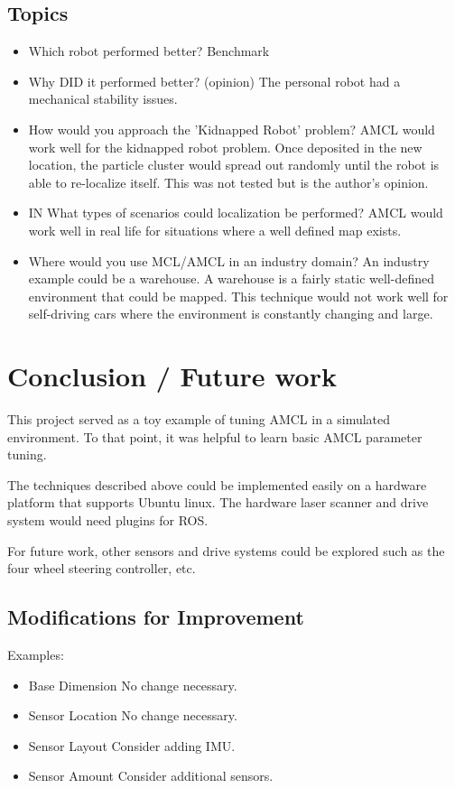 \documentclass[10pt,journal,compsoc]{IEEEtran}
\begin{document}
\subsection{Topics}
\begin{itemize}
\item Which robot performed better?
Benchmark
\item Why DID it performed better? (opinion)
The personal robot had a mechanical stability issues.
\item How would you approach the 'Kidnapped Robot' problem?
AMCL would work well for the kidnapped robot problem. Once deposited in the new location, the particle cluster would spread out randomly until the robot is able to re-localize itself. This was not tested but is the author's opinion.
\item IN What types of scenarios could localization be performed?
AMCL would work well in real life for situations where a well defined map exists.
\item Where would you use MCL/AMCL in an industry domain?
An industry example could be a warehouse. A warehouse is a fairly static well-defined environment that could be mapped. This technique would not work well for self-driving cars where the environment is constantly changing and large.

\end {itemize}

\section{Conclusion / Future work}
This project served as a toy example of tuning AMCL in a simulated environment. To that point, it was helpful to learn basic AMCL parameter tuning.

The techniques described above could be implemented easily on a hardware platform that supports Ubuntu linux. The hardware laser scanner and drive system would need plugins for ROS.

For future work, other sensors and drive systems could be explored such as the four wheel steering controller, etc.

\subsection{Modifications for Improvement}
Examples:
\begin{itemize}
\item Base Dimension
No change necessary.
\item Sensor Location
No change necessary.
\item Sensor Layout
Consider adding IMU.
\item Sensor Amount
Consider additional sensors.
\end{itemize}
\end{document}
